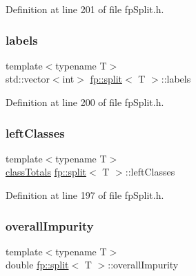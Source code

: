 Definition at line 201 of file fp\+Split.\+h.

\mbox{\label{classfp_1_1split_a9658b163c2cd30e9900e21c3b1c3f2f9}} 
\subsubsection{\texorpdfstring{labels}{labels}}
{\footnotesize\ttfamily template$<$typename T$>$ \\
std\+::vector$<$int$>$ \hyperlink{classfp_1_1split}{fp\+::split}$<$ T $>$\+::labels\hspace{0.3cm}{\ttfamily [protected]}}



Definition at line 200 of file fp\+Split.\+h.

\mbox{\label{classfp_1_1split_a3be6dcf32281715e6376e9f5f8da18f0}} 
\subsubsection{\texorpdfstring{left\+Classes}{leftClasses}}
{\footnotesize\ttfamily template$<$typename T$>$ \\
\hyperlink{classfp_1_1classTotals}{class\+Totals} \hyperlink{classfp_1_1split}{fp\+::split}$<$ T $>$\+::left\+Classes\hspace{0.3cm}{\ttfamily [protected]}}



Definition at line 197 of file fp\+Split.\+h.

\mbox{\label{classfp_1_1split_a1eba74d8afed2852da3eb004afe76bb7}} 
\subsubsection{\texorpdfstring{overall\+Impurity}{overallImpurity}}
{\footnotesize\ttfamily template$<$typename T$>$ \\
double \hyperlink{classfp_1_1split}{fp\+::split}$<$ T $>$\+::overall\+Impurity\hspace{0.3cm}{\ttfamily [protected]}}




